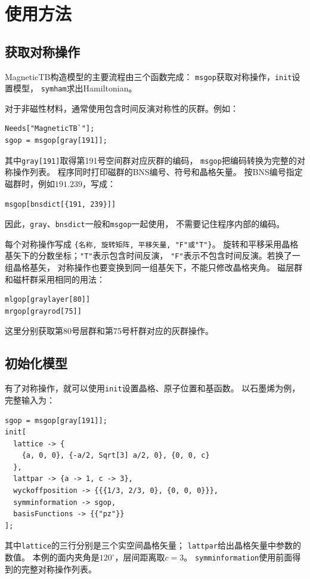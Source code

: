 \documentclass[titlepage,a4paper,12pt,AutoFakeBold]{article}
\begin{document}
\section{使用方法}
\subsection{获取对称操作}
\textsf{MagneticTB}构造模型的主要流程由三个函数完成：
\lstinline|msgop|获取对称操作，\lstinline|init|设置模型，
\lstinline|symham|求出Hamiltonian。

对于非磁性材料，通常使用包含时间反演对称性的灰群。例如：
\begin{lstlisting}
Needs["MagneticTB`"];
sgop = msgop[gray[191]];
\end{lstlisting}
其中\lstinline|gray[191]|取得第191号空间群对应灰群的编码，
\lstinline|msgop|把编码转换为完整的对称操作列表。
程序同时打印磁群的BNS编号、符号和晶格矢量。
按BNS编号指定磁群时，例如$191.239$，写成：
\begin{lstlisting}[numbers=none]
msgop[bnsdict[{191, 239}]]
\end{lstlisting}
因此，\lstinline|gray|、\lstinline|bnsdict|一般和\lstinline|msgop|一起使用，
不需要记住程序内部的编码。

每个对称操作写成
\lstinline|{名称, 旋转矩阵, 平移矢量, "F"或"T"}|。
旋转和平移采用晶格基矢下的分数坐标；\lstinline|"T"|表示包含时间反演，
\lstinline|"F"|表示不包含时间反演。若换了一组晶格基矢，
对称操作也要变换到同一组基矢下，不能只修改晶格夹角。
磁层群和磁杆群采用相同的用法：
\begin{lstlisting}[numbers=none]
mlgop[graylayer[80]]
mrgop[grayrod[75]]
\end{lstlisting}
这里分别获取第80号层群和第75号杆群对应的灰群操作。

\subsection{初始化模型}
\label{sec:init}
有了对称操作，就可以使用\lstinline|init|设置晶格、原子位置和基函数。
以石墨烯为例，完整输入为：
\begin{lstlisting}
sgop = msgop[gray[191]];
init[
  lattice -> {
    {a, 0, 0}, {-a/2, Sqrt[3] a/2, 0}, {0, 0, c}
  },
  lattpar -> {a -> 1, c -> 3},
  wyckoffposition -> {{{1/3, 2/3, 0}, {0, 0, 0}}},
  symminformation -> sgop,
  basisFunctions -> {{"pz"}}
];
\end{lstlisting}
其中\lstinline|lattice|的三行分别是三个实空间晶格矢量；
\lstinline|lattpar|给出晶格矢量中参数的数值。
本例的面内夹角是$120^\circ$，层间距离取$c=3$。
\lstinline|symminformation|使用前面得到的完整对称操作列表。
\end{document}
